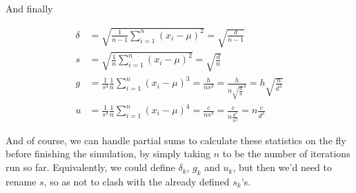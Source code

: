 \documentclass{article}
\begin{document}
\pagebreak
And finally

\begin{align*}
    \delta &= \sqrt{\frac{1}{n-1}\sum_{i=1}^n(x_i-\mu)^2}
      = \sqrt{\frac{d}{n-1}} \\
    s &= \sqrt{\frac{1}{n}\sum_{i=1}^n(x_i-\mu)^2}
      = \sqrt{\frac{d}{n}} \\
    g &= \frac{1}{s^3}\frac{1}{n}\sum_{i=1}^n(x_i-\mu)^3
      = \frac{h}{ns^3}
      = \frac{h}{n\sqrt{\frac{d}{n}}^3}
      = h\sqrt{\frac{n}{d^3}} \\
    u &= \frac{1}{s^4}\frac{1}{n}\sum_{i=1}^n(x_i-\mu)^4
      = \frac{c}{n s^4}
      = \frac{c}{n \frac{d^2}{n^2}}
      = n\frac{c}{d^2}
\end{align*}

And of course, we can handle partial sums to calculate these statistics on the fly
before finishing the simulation,
by simply taking $n$ to be the number of iterations run so far.
Equivalently, we could define $\delta_k$, $g_k$ and $u_k$,
but then we'd need to rename $s$, so as not to clash with the already defined $s_k$'s.
\end{document}
